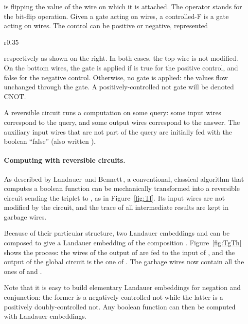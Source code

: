 \documentclass{article}
\theoremstyle{plain}
\theoremstyle{definition}
\begin{document}
is flipping the value of the wire on which it is attached. The
operator  stands for the bit-flip operation. Given a
gate  acting on  wires, a controlled-F is a gate acting on 
wires. The control can be positive or negative, represented
\begin{wrapfigure}{r}{0.35\textwidth}
\vspace{-10pt}
\begin{minipage}{0.33\textwidth}
  
\end{minipage}
\vspace{-10pt}
\end{wrapfigure}
respectively as shown on the right.
In both cases, the top wire is not modified. On the bottom wires, the
gate  is applied if  is true for the positive control, and
false for the negative control. Otherwise, no gate is applied: the
values  flow unchanged through the gate.
A positively-controlled not gate will be denoted CNOT.


A reversible circuit runs a computation on some query: some input
wires correspond to the query, and some output wires correspond to the
answer. The auxiliary input wires that are not part of the query are
initially fed with the boolean ``false'' (also written ).


\paragraph{\bf Computing with reversible circuits.}
As described by Landauer\,\cite{landauer61irreversibility} and
Bennett\,\cite{bennett73logical}, a conventional, classical algorithm
that computes a boolean function  can be mechanically
transformed into a reversible circuit sending the triplet
 to , as in
Figure~\ref{fig:Tf}. Its input wires are not modified by the circuit,
and the trace of all intermediate results are kept in garbage wires.

Because of their particular structure, two Landauer embeddings  and
 can be composed to give a Landauer embedding of
the composition . Figure~\ref{fig:TgTh} shows the process:
the wires of the output of  are fed to the input of , and
the output of the global circuit is the one of . The garbage
wires now contain all the ones of  and .

Note that it is easy to build elementary Landauer embeddings for
negation and conjunction: the former is a negatively-controlled not
while the latter is a positively doubly-controlled not. 
Any boolean function can then be computed with Landauer embeddings.
\end{document}
